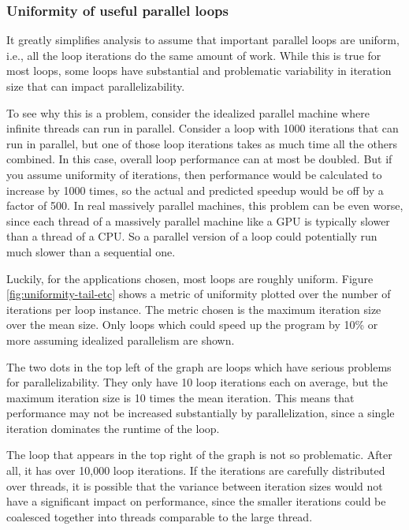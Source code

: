 \documentclass[12pt,twoside]{reedthesis}
\begin{document}
		
		\subsubsection{Uniformity of useful parallel loops}
		
		It greatly simplifies analysis to assume that important parallel loops are uniform, i.e., all the loop iterations do the same amount of work. While this is true for most loops, some loops have substantial and problematic variability in iteration size that can impact parallelizability. 
			
		To see why this is a problem, consider the idealized parallel machine where infinite threads can run in parallel. Consider a loop with 1000 iterations that can run in parallel, but one of those loop iterations takes as much time all the others combined. In this case, overall loop performance can at most be doubled. But if you assume uniformity of iterations, then performance would be calculated to increase by 1000 times, so the actual and predicted speedup would be off by a factor of 500. In real massively parallel machines, this problem can be even worse, since each thread of a massively parallel machine like a GPU is typically slower than a thread of a CPU. So a parallel version of a loop could potentially run much slower than a sequential one. 
		
		Luckily, for the applications chosen, most loops are roughly uniform. Figure \ref{fig:uniformity-tail-etc} shows a metric of uniformity plotted over the number of iterations per loop instance. The metric chosen is the maximum iteration size over the mean size. Only loops which could speed up the program by 10\% or more assuming idealized parallelism are shown. 
		
		The two dots in the top left of the graph are loops which have serious problems for parallelizability. They only have 10 loop iterations each on average, but the maximum iteration size is 10 times the mean iteration. This means that performance may not be increased substantially by parallelization, since a single iteration dominates the runtime of the loop. 
		
		The loop that appears in the top right of the graph is not so problematic. After all, it has over 10,000 loop iterations. If the iterations are carefully distributed over threads, it is possible that the variance between iteration sizes would not have a significant impact on performance, since the smaller iterations could be coalesced together into threads comparable to the large thread.
		
\end{document}
